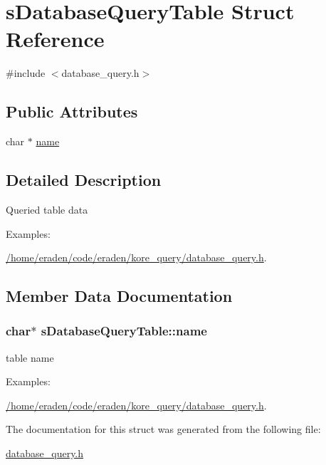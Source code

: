 \hypertarget{structsDatabaseQueryTable}{}\section{s\+Database\+Query\+Table Struct Reference}
\label{structsDatabaseQueryTable}


{\ttfamily \#include $<$database\+\_\+query.\+h$>$}

\subsection*{Public Attributes}
\begin{DoxyCompactItemize}
\item 
char $\ast$ \hyperlink{structsDatabaseQueryTable_a4a57512c1cc994cf4cc526e55e246146}{name}
\end{DoxyCompactItemize}


\subsection{Detailed Description}
Queried table data \begin{Desc}
\item[Examples\+: ]\par
\hyperlink{_2home_2eraden_2code_2eraden_2kore_query_2database_query_8h-example}{/home/eraden/code/eraden/kore\+\_\+query/database\+\_\+query.\+h}.\end{Desc}


\subsection{Member Data Documentation}
\subsubsection[{\texorpdfstring{name}{name}}]{\setlength{\rightskip}{0pt plus 5cm}char$\ast$ s\+Database\+Query\+Table\+::name}\hypertarget{structsDatabaseQueryTable_a4a57512c1cc994cf4cc526e55e246146}{}\label{structsDatabaseQueryTable_a4a57512c1cc994cf4cc526e55e246146}
table name \begin{Desc}
\item[Examples\+: ]\par
\hyperlink{_2home_2eraden_2code_2eraden_2kore_query_2database_query_8h-example}{/home/eraden/code/eraden/kore\+\_\+query/database\+\_\+query.\+h}.\end{Desc}


The documentation for this struct was generated from the following file\+:\begin{DoxyCompactItemize}
\item 
\hyperlink{database__query_8h}{database\+\_\+query.\+h}\end{DoxyCompactItemize}
